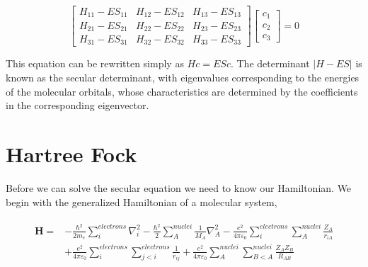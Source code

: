 \begin{equation} \label{eq:SchrodingerMatrix}
  \begin{bmatrix}
    H_{11}-ES_{11} & H_{12}-ES_{12} & H_{13}-ES_{13} \\
    H_{21}-ES_{21} & H_{22}-ES_{22} & H_{23}-ES_{23} \\
    H_{31}-ES_{31} & H_{32}-ES_{32} & H_{33}-ES_{33}
  \end{bmatrix}
  \begin{bmatrix}
    c_1 \\
    c_2 \\
    c_3
  \end{bmatrix} = 0
\end{equation}

This equation can be rewritten simply as $Hc=ESc$. The determinant
$\left| H-ES \right|$ is known as the secular determinant, with
eigenvalues corresponding to the energies of the molecular orbitals,
whose characteristics are determined by the coefficients in the
corresponding eigenvector.\cite{engel2012quantum}

\section{Hartree Fock}
    Before we can solve the secular equation we need to know our
    Hamiltonian.  We begin with the generalized Hamiltonian of a
    molecular system,\cite{engel2012quantum}

    \begin{align} \label{eq:fullhamiltonian}
      \begin{split}
      \bm{H} =& -\frac{\hbar^2}{2m_e}\sum_i^{electrons}\nabla_i^2-\frac{\hbar^2}{2}\sum_{A}^{nuclei}\frac{1}{M_{A}}\nabla_{A}^2 - \frac{e^2}{4\pi\varepsilon_0} \sum_i^{electrons}\sum_A^{nuclei}\frac{Z_A}{r_{iA}} \\
      & + \frac{e^2}{4\pi\varepsilon_0}\sum_{i}^{electrons}\sum_{j<i}^{electrons}\frac{1}{r_{ij}} + \frac{e^2}{4\pi\varepsilon_0}\sum_{A}^{nuclei}\sum_{B<A}^{nuclei}\frac{Z_AZ_B}{R_{AB}}
      \end{split}
    \end{align}

